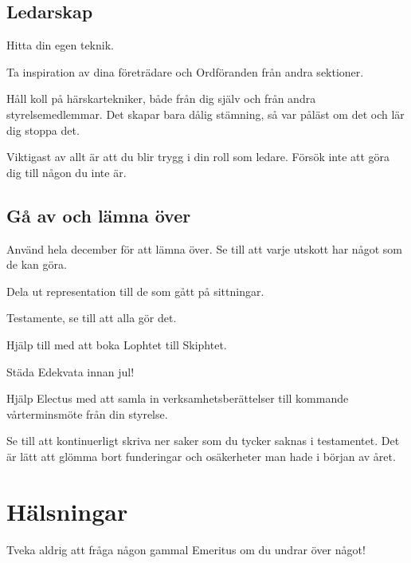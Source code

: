 \documentclass[10pt]{article}
\begin{document}
\subsection{Ledarskap}

\begin{dashlist}
    \item Hitta din egen teknik.
    \item Ta inspiration av dina företrädare och Ordföranden från andra sektioner.
    \item Håll koll på härskartekniker, både från dig själv och från andra styrelsemedlemmar. Det skapar bara dålig stämning, så var påläst om det och lär dig stoppa det.
    \item Viktigast av allt är att du blir trygg i din roll som ledare. Försök inte att göra dig till någon du inte är.
\end{dashlist}

\subsection{Gå av och lämna över}

\begin{dashlist}
    \item Använd hela december för att lämna över. Se till att varje utskott har något som de kan göra.
    \item Dela ut representation till de som gått på sittningar.
    \item Testamente, se till att alla gör det.
    \item Hjälp till med att boka Lophtet till Skiphtet.
    \item Städa Edekvata innan jul!
    \item Hjälp Electus med att samla in verksamhetsberättelser till kommande vårterminsmöte från din styrelse.
    \item Se till att kontinuerligt skriva ner saker som du tycker saknas i testamentet. Det är lätt att glömma bort funderingar och osäkerheter man hade i början av året.
\end{dashlist}

\newpage

\section{Hälsningar}

Tveka aldrig att fråga någon gammal Emeritus om du undrar över något!

\vspace*{1ex}
\end{document}
